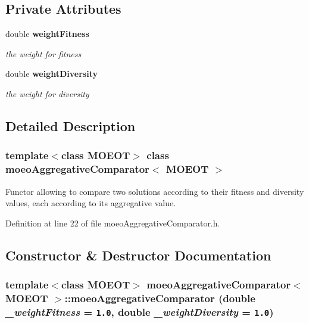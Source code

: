 \subsection*{Private Attributes}
\begin{CompactItemize}
\item 
double \bf{weight\-Fitness}\label{classmoeoAggregativeComparator_9ddf44b9e447bee8503c5b9cad9a7df0}

\begin{CompactList}\small\item\em the weight for fitness \item\end{CompactList}\item 
double \bf{weight\-Diversity}\label{classmoeoAggregativeComparator_d4ce25f797af0218c6c8cfca7c73b2d3}

\begin{CompactList}\small\item\em the weight for diversity \item\end{CompactList}\end{CompactItemize}


\subsection{Detailed Description}
\subsubsection*{template$<$class MOEOT$>$ class moeo\-Aggregative\-Comparator$<$ MOEOT $>$}

Functor allowing to compare two solutions according to their fitness and diversity values, each according to its aggregative value. 



Definition at line 22 of file moeo\-Aggregative\-Comparator.h.

\subsection{Constructor \& Destructor Documentation}
\subsubsection{\setlength{\rightskip}{0pt plus 5cm}template$<$class MOEOT$>$ \bf{moeo\-Aggregative\-Comparator}$<$ MOEOT $>$::\bf{moeo\-Aggregative\-Comparator} (double {\em \_\-weight\-Fitness} = {\tt 1.0}, double {\em \_\-weight\-Diversity} = {\tt 1.0})\hspace{0.3cm}{\tt  [inline]}}\label{classmoeoAggregativeComparator_76cc4d0f5f9bd4984c77410ad8142914}


